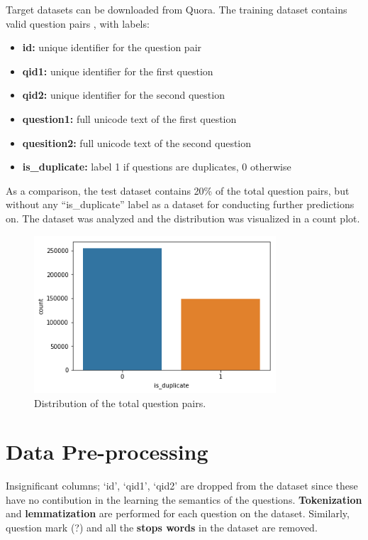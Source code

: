 Target datasets can be downloaded from Quora. The training dataset contains valid question pairs , with labels: 
\begin{itemize}
	\item \textbf{id:} unique identifier for the question pair
	\item \textbf{qid1:} unique identifier for the first question
	\item \textbf{qid2:} unique identifier for the second question
	\item \textbf{question1:} full unicode text of the first question 
	\item \textbf{quesition2:} full unicode text of the second question 
	\item \textbf{is\_duplicate:} label 1 if questions are duplicates, 0 otherwise 
\end{itemize}
As a comparison, the test dataset contains 20\% of the total question pairs, but without any ``is\_duplicate'' label as a dataset for conducting further predictions on. The dataset was analyzed and the distribution was visualized in a count plot.
\begin{figure}[H]
\begin{center}
	\includegraphics[width = 3.55in]{images/count.png}
	\caption{Distribution of the total question pairs.}
\end{center}
\end{figure}

\section{Data Pre-processing}
Insignificant columns; `id', `qid1', `qid2' are dropped from the dataset since these have no contibution in the learning the semantics of the questions. \textbf{Tokenization} and \textbf{lemmatization} are performed for each question on the dataset. Similarly, question mark (?) and all the \textbf{stops words} in the dataset are removed.

